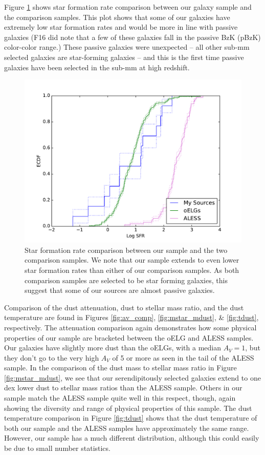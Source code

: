 \documentclass[preprint,natbib209]{aastex}
\begin{document}
Figure \ref{fig:sfr_comp} shows star formation rate comparison between our galaxy sample and the comparison samples. This plot shows that some of our galaxies have extremely low star formation rates and would be more in line with passive galaxies (F16 did note that a few of these galaxies fall in the passive BzK (pBzK) color-color range.) These passive galaxies were unexpected -- all other sub-mm selected galaxies are star-forming galaxies -- and this is the first time passive galaxies have been selected in the sub-mm at high redshift. 

\begin{figure}[t]
\centering
\includegraphics[scale=0.8]{ecdf_sfr.pdf}
\caption{Star formation rate comparison between our sample and the two comparison samples. We note that our sample extends to even lower star formation rates than either of our comparison samples. As both comparison samples are selected to be star forming galaxies, this suggest that some of our sources are almost passive galaxies.}
\label{fig:sfr_comp}
\end{figure}

Comparison of the dust attenuation, dust to stellar mass ratio, and the dust temperature are found in Figures \ref{fig:av_comp}, \ref{fig:mstar_mdust}, \& \ref{fig:tdust}, respectively. The attenuation comparison again demonstrates how some physical properties of our sample are bracketed between the oELG and ALESS samples. Our galaxies have slightly more dust than the oELGs, with a median $A_V = 1$, but they don't go to the very high $A_V$ of 5 or more as seen in the tail of the ALESS sample. In the comparison of the dust mass to stellar mass ratio in Figure \ref{fig:mstar_mdust}, we see that our serendipitously selected galaxies extend to one dex lower dust to stellar mass ratios than the ALESS sample. Others in our sample match the ALESS sample quite well in this respect, though, again showing the diversity and range of physical properties of this sample. The dust temperature comparison in Figure \ref{fig:tdust} shows that the dust temperature of both our sample and the ALESS samples have approximately the same range. However, our sample has a much different distribution, although this could easily be due to small number statistics.
\end{document}
